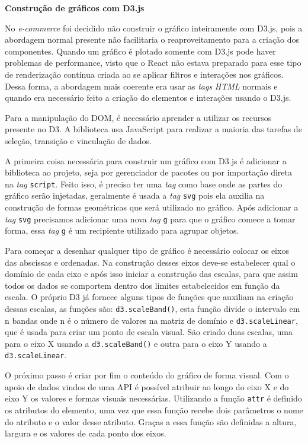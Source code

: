 {\textbf{Construção de gráficos com D3.js}}



No \textit{e-commerce} foi decidido não construir o gráfico inteiramente com D3.js, pois a abordagem normal presente não facilitaria o reaproveitamento para a criação dos componentes. Quando um gráfico é plotado somente com D3.js  pode haver problemas de performance, visto que o React \cite{REACT} não estava preparado para esse tipo de renderização contínua criada ao se aplicar filtros e interações nos gráficos. Dessa forma, a abordagem mais coerente era usar as \textit{tags} \textit{HTML} normais e quando era necessário feito a criação do elementos e interações usando o D3.js.

Para a manipulação do DOM, é necessário aprender a utilizar os recursos presente no D3. A biblioteca usa JavaScript para realizar a maioria das tarefas de seleção, transição e vinculação de dados.

A primeira coisa necessária para construir um gráfico com D3.js é adicionar a biblioteca ao projeto, seja por gerenciador de pacotes ou por importação direta na \textit{tag} \lstinline{script}. Feito isso, é preciso ter uma \textit{tag} como base onde as partes do gráfico serão injetadas, geralmente é usada a \textit{tag} \lstinline{svg} pois ela auxilia na construção de formas geométricas que será utilizado no gráfico. Após adicionar a \textit{tag} \lstinline{svg} precisamos adicionar uma nova \textit{tag} \lstinline{g} para que o gráfico comece a tomar forma, essa \textit{tag} \lstinline{g} é um recipiente utilizado para agrupar objetos.

Para começar a desenhar qualquer tipo de gráfico é necessário colocar os eixos das abscissas e ordenadas. Na construção desses eixos deve-se estabelecer qual o domínio de cada eixo e após isso iniciar a construção das escalas, para que assim todos os dados se comportem dentro dos limites estabelecidos em função da escala. O próprio D3  já fornece alguns tipos de funções que auxiliam na criação dessas escalas, as funções são: \lstinline{d3.scaleBand()}, esta função divide o intervalo em n bandas onde n é o número de valores na matriz de domínio e \lstinline{d3.scaleLinear}, que é usada para criar um ponto de escala visual. São criado duas escalas, uma para o eixo X usando a \lstinline{d3.scaleBand()} e outra para o eixo Y usando a \lstinline{d3.scaleLinear}.

O próximo passo é criar por fim o conteúdo do gráfico de forma visual. Com o apoio de dados vindos de uma API é possível atribuir ao longo do eixo X e do eixo Y os valores e formas visuais necessárias. Utilizando a função \lstinline{attr} é definido os atributos do elemento, uma vez que essa função recebe dois parâmetros o nome do atributo e o valor desse atributo. Graças a essa função são definidas a altura, largura e os valores de cada ponto dos eixos.

